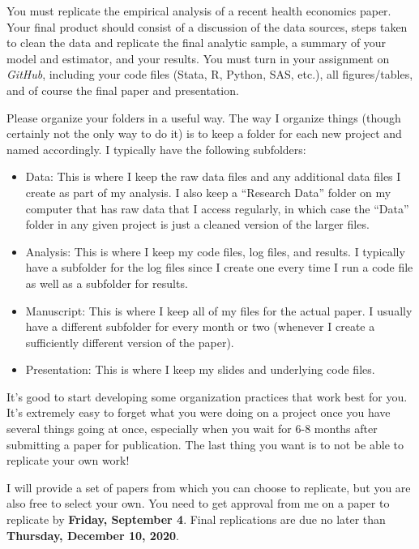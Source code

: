 \documentclass[11pt,]{article}
\begin{document}
You must replicate the empirical analysis of a recent health economics
paper. Your final product should consist of a discussion of the data
sources, steps taken to clean the data and replicate the final analytic
sample, a summary of your model and estimator, and your results. You
must turn in your assignment on \emph{GitHub}, including your code files
(Stata, R, Python, SAS, etc.), all figures/tables, and of course the
final paper and presentation.

Please organize your folders in a useful way. The way I organize things
(though certainly not the only way to do it) is to keep a folder for
each new project and named accordingly. I typically have the following
subfolders:

\begin{itemize}
\item
  Data: This is where I keep the raw data files and any additional data
  files I create as part of my analysis. I also keep a ``Research Data''
  folder on my computer that has raw data that I access regularly, in
  which case the ``Data'' folder in any given project is just a cleaned
  version of the larger files.
\item
  Analysis: This is where I keep my code files, log files, and results.
  I typically have a subfolder for the log files since I create one
  every time I run a code file as well as a subfolder for results.
\item
  Manuscript: This is where I keep all of my files for the actual paper.
  I usually have a different subfolder for every month or two (whenever
  I create a sufficiently different version of the paper).
\item
  Presentation: This is where I keep my slides and underlying code
  files.
\end{itemize}

It's good to start developing some organization practices that work best
for you. It's extremely easy to forget what you were doing on a project
once you have several things going at once, especially when you wait for
6-8 months after submitting a paper for publication. The last thing you
want is to not be able to replicate your own work!

I will provide a set of papers from which you can choose to replicate,
but you are also free to select your own. You need to get approval from
me on a paper to replicate by \textbf{Friday, September 4}. Final
replications are due no later than \textbf{Thursday, December 10, 2020}.
\end{document}
